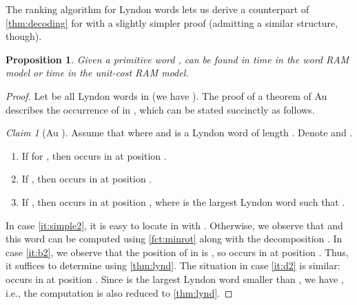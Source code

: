 \documentclass{article}
\newtheorem{proposition}[theorem]{Proposition}
\theoremstyle{definition}
\theoremstyle{remark}
\newtheorem*{claim}{Claim}
\begin{document}
The ranking algorithm for Lyndon words lets us derive a counterpart of \cref{thm:decoding}
for  with a slightly simpler proof (admitting a similar structure, though).
\begin{proposition}\label{prop:decoding2}
Given a primitive word , 
  can be found in  time in the word RAM model or  time in the unit-cost RAM model.
\end{proposition}
\begin{proof}
  Let  be all Lyndon words in 
  (we have ).
  The proof of a theorem of Au \cite[Theorem 9]{DBLP:journals/dm/Au15}
  describes the occurrence of  in , which can be stated succinctly as follows.
  \begin{claim}[Au \cite{DBLP:journals/dm/Au15}]
       Assume that  where  and  is a Lyndon word of length .
     Denote  and .
  \begin{enumerate}[label={(\alph*)}]
    \item\label{it:simple2} If  for , then  occurs in  at position .
    \item\label{it:b2} If , then  occurs in  at position .
    \item\label{it:d2} If , then  occurs in  at position ,
    where  is the largest Lyndon word  such that .
  \end{enumerate}
  \end{claim}

  In case \ref{it:simple2}, it is easy to locate  in  with .
  Otherwise, we observe that  and this word can be computed using \cref{fct:minrot} along with the decomposition
  .
  In case \ref{it:b2}, we observe that the position of  in 
  is , so  occurs in  at position .
  Thus, it suffices to determine  using \cref{thm:lynd}.
  The situation in case \ref{it:d2} is similar:  occurs in  at position .
  Since  is the largest Lyndon word smaller than , we have ,
  i.e., the computation is also reduced to \cref{thm:lynd}.
\end{proof}
\end{document}
